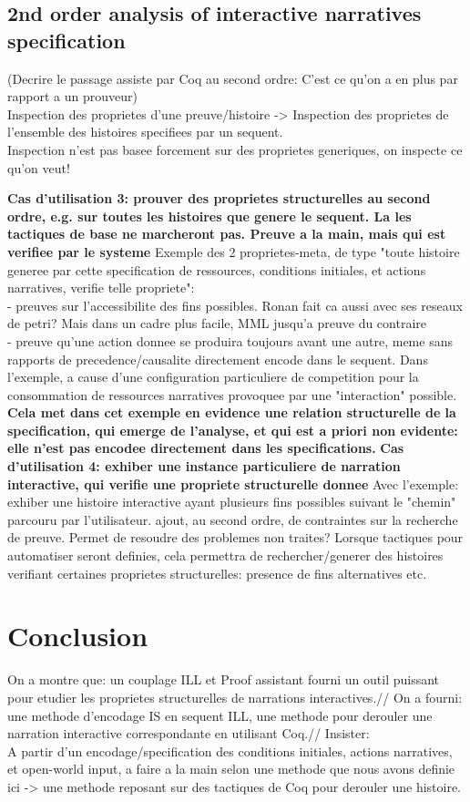 \documentclass[runningheads,a4paper]{llncs}
\begin{document}
\subsection{2nd order analysis of interactive narratives specification}
(Decrire le passage assiste par Coq au second ordre: C'est ce qu'on a en plus par rapport a un prouveur)
\\
Inspection des proprietes d'une preuve/histoire -> Inspection des proprietes de l'ensemble des histoires specifiees par un sequent.\\
Inspection n'est pas basee forcement sur des proprietes generiques, on inspecte ce qu'on veut!

\textbf{Cas d'utilisation 3: prouver des proprietes structurelles au second ordre, e.g. sur toutes les histoires que genere le sequent. La les tactiques de base ne marcheront pas. Preuve a la main, mais qui est verifiee par le systeme}
Exemple des 2 proprietes-meta, de type "toute histoire generee par cette specification de ressources, conditions initiales, et actions narratives, verifie telle propriete":\\
- preuves sur l'accessibilite des fins possibles. Ronan fait ca aussi avec ses reseaux de petri? Mais dans un cadre plus facile, MML jusqu'a preuve du contraire\\
- preuve qu'une action donnee se produira toujours avant une autre, meme sans rapports de precedence/causalite directement encode dans le sequent. Dans l'exemple, a cause d'une configuration particuliere de competition pour la consommation de ressources narratives provoquee par une "interaction" possible. \textbf{Cela met dans cet exemple en evidence une relation structurelle de la specification, qui emerge de l'analyse, et qui est a priori non evidente: elle n'est pas encodee directement dans les specifications.}
\textbf{Cas d'utilisation 4: exhiber une instance particuliere de narration interactive, qui verifie une propriete structurelle donnee}
Avec l'exemple: exhiber une histoire interactive ayant plusieurs fins possibles suivant le "chemin" parcouru par l'utilisateur.
ajout, au second ordre, de contraintes sur la recherche de preuve. Permet de resoudre des problemes non traites?
Lorsque tactiques pour automatiser seront definies, cela permettra de rechercher/generer des histoires verifiant certaines proprietes structurelles: presence de fins alternatives etc.
\section{Conclusion}
On a montre que: un couplage ILL et Proof assistant fourni un outil puissant pour etudier les proprietes structurelles de narrations interactives.//
On a fourni: une methode d'encodage IS en sequent ILL, une methode pour derouler une narration interactive correspondante en utilisant Coq.//
Insister:\\
A partir d'un encodage/specification des conditions initiales, actions narratives, et open-world input, a faire a la main selon une methode que nous avons definie ici -> une methode reposant sur des tactiques de Coq pour derouler une histoire.

%


\end{document}
